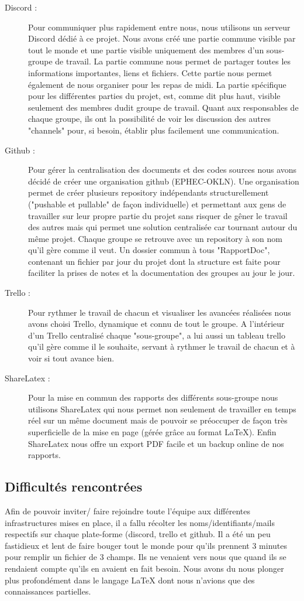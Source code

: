 \documentclass{article}
\begin{document}
    \begin{description}
        \item[Discord :] Pour communiquer plus rapidement entre nous, nous utilisons un serveur Discord dédié à ce projet. Nous avons créé une partie commune visible par tout le monde et une partie visible uniquement des membres d’un sous-groupe de travail.
        La partie commune nous permet de partager toutes les informations importantes, liens et fichiers. Cette partie nous permet également de nous organiser pour les repas de midi.
        La partie spécifique pour les différentes parties du projet, est, comme dit plus haut, visible seulement des membres dudit groupe de travail. Quant aux responsables de chaque groupe, ils ont la possibilité de voir les discussion des autres "channels" pour, si besoin, établir plus facilement une communication.
        \item[Github :] Pour gérer la centralisation des documents et des codes sources nous avons décidé de créer une organisation github (EPHEC-OKLN). Une organisation permet de créer plusieurs repository indépendants structurellement ("pushable et pullable" de façon individuelle) et permettant aux gens de travailler sur leur propre partie du projet sans risquer de gêner le travail des autres mais qui permet une solution centralisée car tournant autour du même projet. Chaque groupe se retrouve avec un repository à son nom qu'il gère comme il veut. Un dossier commun à tous "RapportDoc", contenant un fichier par jour du projet dont la structure est faite pour faciliter la prises de notes et la documentation des groupes au jour le jour.
        \item[Trello :] Pour rythmer le travail de chacun et visualiser les avancées réalisées nous avons choisi Trello, dynamique et connu de tout le groupe. A l'intérieur d'un Trello centralisé chaque "sous-groupe", a lui aussi un tableau trello qu'il gère comme il le souhaite, servant à rythmer le travail de chacun et à voir si tout avance bien.
        \item [ShareLatex :] Pour la mise en commun des rapports des différents sous-groupe nous utilisons ShareLatex qui nous permet non seulement de travailler en temps réel sur un même document mais de pouvoir se préoccuper de façon très superficielle de la mise en page (gérée grâce au format LaTeX). Enfin ShareLatex nous offre un export PDF facile et un backup online de nos rapports.
    \end{description}
    \subsection{Difficultés rencontrées} 
    Afin de pouvoir inviter/ faire rejoindre toute l'équipe aux différentes infrastructures mises en place, il a fallu récolter les noms/identifiants/mails respectifs sur chaque plate-forme (discord, trello et github. Il a été un peu fastidieux et lent de faire bouger tout le monde pour qu'ils prennent 3 minutes pour remplir un fichier de 3 champs. Ils ne venaient vers nous que quand ils se rendaient compte qu'ils en avaient en fait besoin.  
    Nous avons du nous plonger plus profondément dans le langage LaTeX dont nous n'avions que des connaissances partielles.
\end{document}

